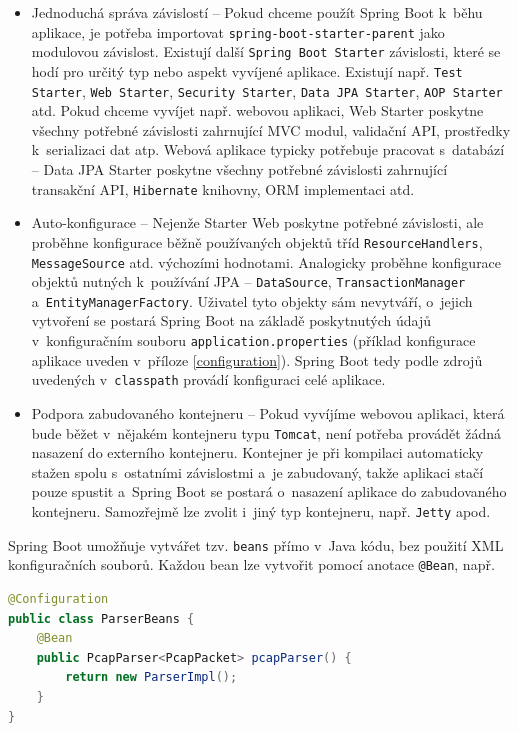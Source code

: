 \begin{itemize}
    \item Jednoduchá správa závislostí -- Pokud chceme použít Spring Boot k~běhu aplikace, je potřeba importovat \texttt{spring-boot-starter-parent} jako modulovou závislost. Existují další \texttt{Spring Boot Starter} závislosti, které se hodí pro určitý typ nebo aspekt vyvíjené aplikace. Existují např. \texttt{Test Starter}, \texttt{Web Starter}, \texttt{Security Starter}, \texttt{Data JPA Starter}, \texttt{AOP Starter} atd. Pokud chceme vyvíjet např. webovou aplikaci, Web Starter poskytne všechny potřebné závislosti zahrnující MVC modul, validační API, prostředky k~serializaci dat atp. Webová aplikace typicky potřebuje pracovat s~databází -- Data JPA Starter poskytne všechny potřebné závislosti zahrnující transakční API, \texttt{Hibernate} knihovny, ORM implementaci atd.
    
    \item Auto-konfigurace -- Nejenže Starter Web poskytne potřebné závislosti, ale proběhne konfigurace běžně používaných objektů tříd \texttt{ResourceHandlers}, \texttt{MessageSource} atd. výchozími hodnotami. Analogicky proběhne konfigurace objektů nutných k~používání JPA -- \texttt{DataSource}, \texttt{TransactionManager} a~\texttt{EntityManagerFactory}. Uživatel tyto objekty sám nevytváří, o~jejich vytvoření se postará Spring Boot na základě poskytnutých údajů v~konfiguračním souboru \texttt{application.properties} (příklad konfigurace aplikace uveden v~příloze \ref{configuration}). Spring Boot tedy podle zdrojů uvedených v~\texttt{classpath} provádí konfiguraci celé aplikace.
    
    \item Podpora zabudovaného kontejneru -- Pokud vyvíjíme webovou aplikaci, která bude běžet v~nějakém kontejneru typu \texttt{Tomcat}, není potřeba provádět žádná nasazení do externího kontejneru. Kontejner je při kompilaci automaticky stažen spolu s~ostatními závislostmi a~je zabudovaný, takže aplikaci stačí pouze spustit a~Spring Boot se postará o~nasazení aplikace do zabudovaného kontejneru. Samozřejmě lze zvolit i~jiný typ kontejneru, např. \texttt{Jetty} apod.
\end{itemize}

\noindent Spring Boot umožňuje vytvářet tzv. \texttt{beans} přímo v~Java kódu, bez použití XML konfiguračních souborů. Každou bean lze vytvořit pomocí anotace \texttt{@Bean}, např.

\begin{lstlisting}[language=Java,frame=tb,basicstyle={\small\ttfamily}]
@Configuration
public class ParserBeans {
    @Bean
    public PcapParser<PcapPacket> pcapParser() {
        return new ParserImpl();
    }
}
\end{lstlisting}

